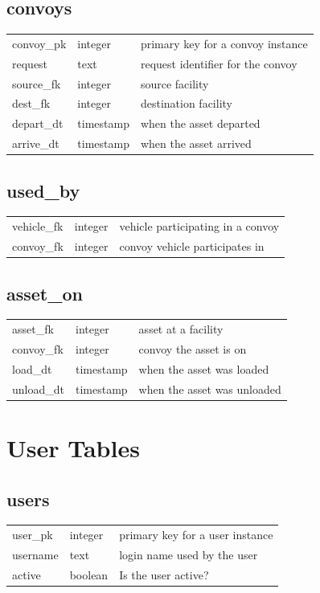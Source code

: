 \subsection*{convoys}
\begin{tabular}{l|l|l}
\hline
convoy\_pk & integer & primary key for a convoy instance \\
request & text & request identifier for the convoy \\
source\_fk & integer & source facility \\
dest\_fk & integer & destination facility \\
depart\_dt & timestamp & when the asset departed \\
arrive\_dt & timestamp & when the asset arrived \\
\hline
\end{tabular}

\subsection*{used\_by}
\begin{tabular}{l|l|l}
\hline
vehicle\_fk & integer & vehicle participating in a convoy \\
convoy\_fk & integer & convoy vehicle participates in \\
\hline
\end{tabular}

\subsection*{asset\_on}
\begin{tabular}{l|l|l}
\hline
asset\_fk & integer & asset at a facility \\
convoy\_fk & integer & convoy the asset is on \\
load\_dt & timestamp & when the asset was loaded \\
unload\_dt & timestamp & when the asset was unloaded \\
\hline
\end{tabular}


\section*{User Tables}

\subsection*{users}
\begin{tabular}{l|l|l}
\hline
user\_pk & integer & primary key for a user instance \\
username & text & login name used by the user \\
active & boolean & Is the user active? \\
\hline
\end{tabular}

